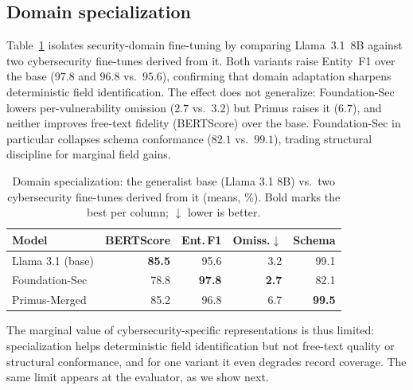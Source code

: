\subsection{Domain specialization}\label{sec:rq3}

Table~\ref{tab:rq3} isolates security-domain fine-tuning by comparing Llama~3.1~8B against two cybersecurity fine-tunes derived from it. Both variants raise Entity~F1 over the base ($97.8$ and $96.8$ vs.\ $95.6$), confirming that domain adaptation sharpens deterministic field identification. The effect does not generalize: Foundation-Sec lowers per-vulnerability omission ($2.7$ vs.\ $3.2$) but Primus raises it ($6.7$), and neither improves free-text fidelity (BERTScore) over the base. Foundation-Sec in particular collapses schema conformance ($82.1$ vs.\ $99.1$), trading structural discipline for marginal field gains.

\begin{table}[!htp]
\centering
\caption{Domain specialization: the generalist base (Llama 3.1 8B) vs.\ two cybersecurity fine-tunes derived from it (means, \%). Bold marks the best per column; $\downarrow$ lower is better.}
\label{tab:rq3}
\small
\begin{tabular}{lrrrr}
\hline
\textbf{Model} & \textbf{BERTScore} & \textbf{Ent.\,F1} & \textbf{Omiss.}$\downarrow$ & \textbf{Schema} \\
\hline
Llama 3.1 (base)   & \textbf{85.5} & 95.6 & 3.2 & 99.1 \\
Foundation-Sec     & 78.8 & \textbf{97.8} & \textbf{2.7} & 82.1 \\
Primus-Merged      & 85.2 & 96.8 & 6.7 & \textbf{99.5} \\
\hline
\end{tabular}
\end{table}

The marginal value of cybersecurity-specific representations is thus limited: specialization helps deterministic field identification but not free-text quality or structural conformance, and for one variant it even degrades record coverage. The same limit appears at the evaluator, as we show next.

